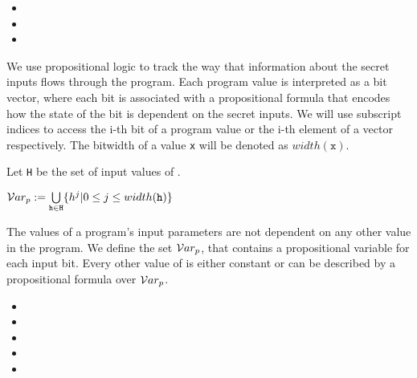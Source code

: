 \begin{itemize}
    \item {}
    \item {}
    \item {}
\end{itemize}

We use propositional logic to track the way that information about the secret inputs flows through the program. Each program value is interpreted as a bit vector, where each bit is associated with a propositional formula that encodes how the state of the bit is dependent on the secret inputs. We will use subscript indices to access the i-th bit of a program value or the i-th element of a vector respectively. The bitwidth of a value \texttt{x} will be denoted as $width(\mathtt{x})$.

\begin{definition}
    Let \texttt{H} be the set of input values of \pp.
    \begin{center}
        $\mathcal{V}ar_p := \bigcup\limits_{\mathtt{h} \in \mathtt{H}} \{h^j | 0 \leq j \leq width(\mathtt{h})\}$
    \end{center}
    The values of a program's input parameters are not dependent on any other value in the program. We define the set $\mathcal{V}ar_p$, that contains a propositional variable for each input bit. Every other value of \p is either constant or can be described by a propositional formula over $\mathcal{V}ar_p$.
\end{definition}

\textbf{}

\begin{itemize}
    \item {}
    \item {}
    \item {} 
    \item {}
    \item {}
\end{itemize}

